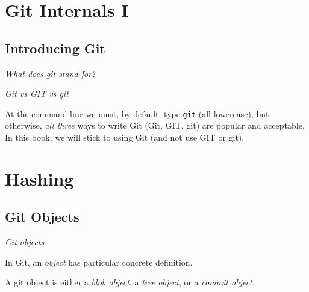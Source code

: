 \chapter{Git Internals I}




\section{Introducing Git}


\frmrule

\textit{What does git stand for?}


\frmrule

\textit{Git vs GIT vs git}

At the command line we must, by default, type \lstinline{git} (all lowercase), but 
otherwise, \textit{all three} ways to 
write Git (Git, GIT, git) are popular and acceptable.
In this book, we will stick to using Git (and not use GIT or git).

\frmrule 

\chapter{Hashing}
\section{Git Objects}


\frmrule 

\textit{Git objects}

In Git, an \textit{object} has particular concrete definition.


A git object is either a \textit{blob object}, 
a \textit{tree object}, or a \textit{commit object}. 


\begin{figure}[h]
\end{figure}

